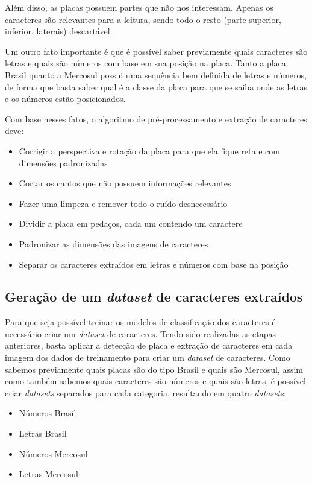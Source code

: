 Além disso, as placas possuem partes que não nos interessam. Apenas os caracteres são relevantes para a leitura, sendo todo o resto (parte superior, inferior, laterais) descartável.

Um outro fato importante é que é possível saber previamente quais caracteres são letras e quais são números com base em sua posição na placa. Tanto a placa Brasil quanto a Mercosul possui uma sequência bem definida de letras e números, de forma que basta saber qual é a classe da placa para que se saiba onde as letras e os números estão posicionados.

Com base nesses fatos, o algoritmo de pré-processamento e extração de caracteres deve:

\begin{itemize}
	\item Corrigir a perspectiva e rotação da placa para que ela fique reta e com dimensões padronizadas
	\item Cortar os cantos que não possuem informações relevantes
	\item Fazer uma limpeza e remover todo o ruído desnecessário
	\item Dividir a placa em pedaços, cada um contendo um caractere
	\item Padronizar as dimensões das imagens de caracteres
	\item Separar os caracteres extraídos em letras e números com base na posição
\end{itemize}

\subsection{Geração de um \textit{dataset} de caracteres extraídos}

Para que seja possível treinar os modelos de classificação dos caracteres é necessário criar um \textit{dataset} de caracteres. Tendo sido realizadas as etapas anteriores, basta aplicar a detecção de placa e extração de caracteres em cada imagem dos dados de treinamento para criar um \textit{dataset} de caracteres. Como sabemos previamente quais placas são do tipo Brasil e quais são Mercosul, assim como também sabemos quais caracteres são números e quais são letras, é possível criar \textit{datasets} separados para cada categoria, resultando em quatro \textit{datasets}:

\begin{itemize}
	\item Números Brasil
	\item Letras Brasil
	\item Números Mercosul
	\item Letras Mercosul
\end{itemize}

